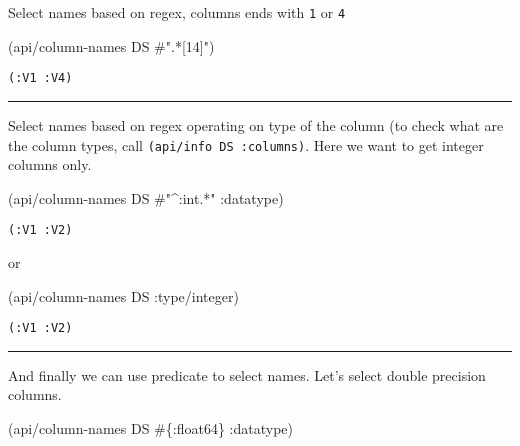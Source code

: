 \documentclass[]{article}
\newenvironment{Shaded}{\begin{snugshade}}{\end{snugshade}}
\newcommand{\SpecialStringTok}[1]{\textcolor[rgb]{0.31,0.60,0.02}{#1}}
\newcommand{\AttributeTok}[1]{\textcolor[rgb]{0.77,0.63,0.00}{#1}}
\newcommand{\NormalTok}[1]{#1}
\begin{document}
Select names based on regex, columns ends with \texttt{1} or \texttt{4}

\begin{Shaded}
\begin{Highlighting}[]
\NormalTok{(api/column-names DS }\SpecialStringTok{#".*[14]"}\NormalTok{)}
\end{Highlighting}
\end{Shaded}

\begin{verbatim}
(:V1 :V4)
\end{verbatim}

\begin{center}\rule{0.5\linewidth}{0.5pt}\end{center}

Select names based on regex operating on type of the column (to check
what are the column types, call \texttt{(api/info\ DS\ :columns)}. Here
we want to get integer columns only.

\begin{Shaded}
\begin{Highlighting}[]
\NormalTok{(api/column-names DS }\SpecialStringTok{#"^:int.*"} \AttributeTok{:datatype}\NormalTok{)}
\end{Highlighting}
\end{Shaded}

\begin{verbatim}
(:V1 :V2)
\end{verbatim}

or

\begin{Shaded}
\begin{Highlighting}[]
\NormalTok{(api/column-names DS }\AttributeTok{:type/integer}\NormalTok{)}
\end{Highlighting}
\end{Shaded}

\begin{verbatim}
(:V1 :V2)
\end{verbatim}

\begin{center}\rule{0.5\linewidth}{0.5pt}\end{center}

And finally we can use predicate to select names. Let's select double
precision columns.

\begin{Shaded}
\begin{Highlighting}[]
\NormalTok{(api/column-names DS #\{}\AttributeTok{:float64}\NormalTok{\} }\AttributeTok{:datatype}\NormalTok{)}
\end{Highlighting}
\end{Shaded}
\end{document}
